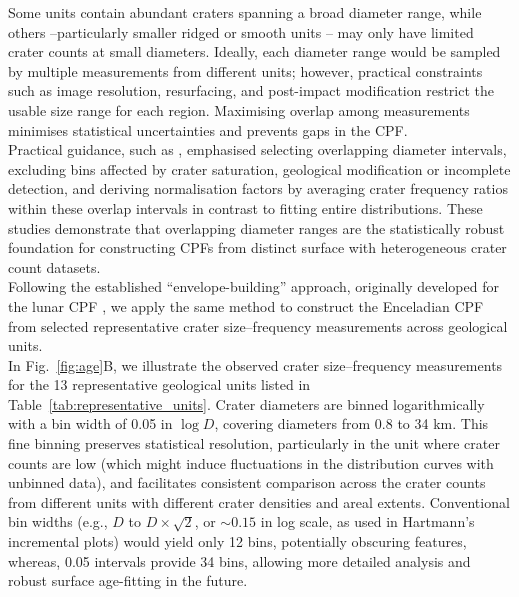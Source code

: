 \documentclass[preprint,11pt,3p,times,authoryear]{elsarticle}
\begin{document}
Some units contain abundant craters spanning a broad diameter range, while others --particularly smaller ridged or smooth units -- may only have limited crater counts at small diameters. Ideally, each diameter range would be sampled by multiple measurements from different units; however, practical constraints such as image resolution, resurfacing, and post-impact modification restrict the usable size range for each region. Maximising overlap among measurements minimises statistical uncertainties and prevents gaps in the CPF.\\

Practical guidance, such as \citet{Neukum1983,Xiao2015,Robbins2018}, emphasised selecting overlapping diameter intervals, excluding bins affected by crater saturation, geological modification or incomplete detection, and deriving normalisation factors by averaging crater frequency ratios within these overlap intervals in contrast to fitting entire distributions. These studies demonstrate that overlapping diameter ranges are the statistically robust foundation for constructing CPFs from distinct surface with heterogeneous crater count datasets.\\

Following the established ``envelope-building'' approach, originally developed for the lunar CPF \citep{Neukum1983}, we apply the same method to construct the Enceladian CPF from selected representative crater size–frequency measurements across geological units. \\

In Fig.~\ref{fig:age}B, we illustrate the observed crater size–frequency measurements for the 13 representative geological units listed in Table~\ref{tab:representative_units}. Crater diameters are binned logarithmically with a bin width of 0.05 in $\log D$, covering diameters from 0.8 to 34 km. This fine binning preserves statistical resolution, particularly in the unit where crater counts are low (which might induce fluctuations in the distribution curves with unbinned data), and facilitates consistent comparison across the crater counts from different units with different crater densities and areal extents.
Conventional bin widths (e.g., $D$ to $D \times \sqrt{2}$, or $\sim0.15$ in log scale, as used in Hartmann's incremental plots) would yield only 12 bins, potentially obscuring features, whereas, 0.05 intervals provide 34 bins, allowing more detailed analysis and robust surface age-fitting in the future.\\
\end{document}
